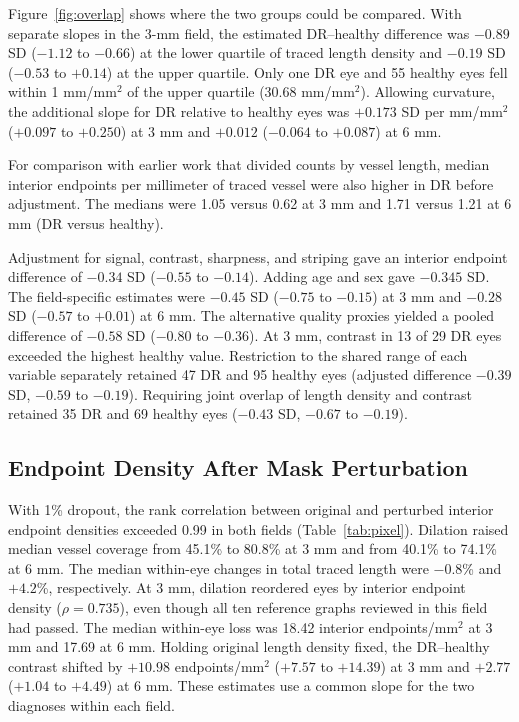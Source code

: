 \documentclass[letterpaper]{article}
\begin{document}
Figure~\ref{fig:overlap} shows where the two groups could be compared. With separate slopes in the 3-mm field, the estimated DR--healthy difference was $-0.89$ SD ($-1.12$ to $-0.66$) at the lower quartile of traced length density and $-0.19$ SD ($-0.53$ to $+0.14$) at the upper quartile. Only one DR eye and 55 healthy eyes fell within 1 mm/mm$^2$ of the upper quartile (30.68 mm/mm$^2$). Allowing curvature, the additional slope for DR relative to healthy eyes was $+0.173$ SD per mm/mm$^2$ ($+0.097$ to $+0.250$) at 3 mm and $+0.012$ ($-0.064$ to $+0.087$) at 6 mm.

For comparison with earlier work that divided counts by vessel length, median interior endpoints per millimeter of traced vessel were also higher in DR before adjustment. The medians were 1.05 versus 0.62 at 3 mm and 1.71 versus 1.21 at 6 mm (DR versus healthy).

Adjustment for signal, contrast, sharpness, and striping gave an interior endpoint difference of $-0.34$ SD ($-0.55$ to $-0.14$). Adding age and sex gave $-0.345$ SD. The field-specific estimates were $-0.45$ SD ($-0.75$ to $-0.15$) at 3 mm and $-0.28$ SD ($-0.57$ to $+0.01$) at 6 mm. The alternative quality proxies yielded a pooled difference of $-0.58$ SD ($-0.80$ to $-0.36$). At 3 mm, contrast in 13 of 29 DR eyes exceeded the highest healthy value. Restriction to the shared range of each variable separately retained 47 DR and 95 healthy eyes (adjusted difference $-0.39$ SD, $-0.59$ to $-0.19$). Requiring joint overlap of length density and contrast retained 35 DR and 69 healthy eyes ($-0.43$ SD, $-0.67$ to $-0.19$).

\subsection{Endpoint Density After Mask Perturbation}
With 1\% dropout, the rank correlation between original and perturbed interior endpoint densities exceeded 0.99 in both fields (Table~\ref{tab:pixel}). Dilation raised median vessel coverage from 45.1\% to 80.8\% at 3 mm and from 40.1\% to 74.1\% at 6 mm. The median within-eye changes in total traced length were $-0.8$\% and $+4.2$\%, respectively. At 3 mm, dilation reordered eyes by interior endpoint density ($\rho=0.735$), even though all ten reference graphs reviewed in this field had passed. The median within-eye loss was 18.42 interior endpoints/mm$^2$ at 3 mm and 17.69 at 6 mm. Holding original length density fixed, the DR--healthy contrast shifted by $+10.98$ endpoints/mm$^2$ ($+7.57$ to $+14.39$) at 3 mm and $+2.77$ ($+1.04$ to $+4.49$) at 6 mm. These estimates use a common slope for the two diagnoses within each field.
\end{document}
